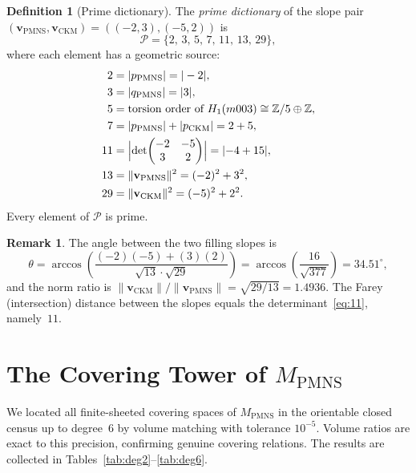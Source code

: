 \documentclass[12pt]{article}
\theoremstyle{definition}
\newtheorem{definition}[theorem]{Definition}
\newtheorem{remark}[theorem]{Remark}
\begin{document}
\begin{definition}[Prime dictionary]
\label{def:dict}
The \emph{prime dictionary} of the slope pair
$(\mathbf{v}_{\mathrm{PMNS}}, \mathbf{v}_{\mathrm{CKM}}) =
((-2,3),(-5,2))$ is
\[
  \mathcal{P} = \{2,\,3,\,5,\,7,\,11,\,13,\,29\},
\]
where each element has a geometric source:
\begin{align}
  2  &= |p_{\mathrm{PMNS}}| = |-2|, \label{eq:2}\\
  3  &= |q_{\mathrm{PMNS}}| = |3|,  \label{eq:3}\\
  5  &= \text{torsion order of }
       H_1(m003) \cong \mathbb{Z}/5 \oplus \mathbb{Z}, \label{eq:5}\\
  7  &= |p_{\mathrm{PMNS}}| + |p_{\mathrm{CKM}}| = 2 + 5, \label{eq:7}\\
  11 &= \Bigl|\det\!\begin{pmatrix}-2&-5\\3&2\end{pmatrix}\Bigr|
       = |{-4+15}|, \label{eq:11}\\
  13 &= \|\mathbf{v}_{\mathrm{PMNS}}\|^2 = (-2)^2+3^2, \label{eq:13}\\
  29 &= \|\mathbf{v}_{\mathrm{CKM}}\|^2  = (-5)^2+2^2. \label{eq:29}
\end{align}
Every element of $\mathcal{P}$ is prime.
\end{definition}

\begin{remark}
The angle between the two filling slopes is
\[
  \theta
  = \arccos\!\left(
      \frac{(-2)(-5)+(3)(2)}{\sqrt{13}\cdot\sqrt{29}}
    \right)
  = \arccos\!\left(\frac{16}{\sqrt{377}}\right)
  = 34.51^\circ,
\]
and the norm ratio is
$\|\mathbf{v}_{\mathrm{CKM}}\|/\|\mathbf{v}_{\mathrm{PMNS}}\|
= \sqrt{29/13} = 1.4936$.
The Farey (intersection) distance between the slopes equals the
determinant~\eqref{eq:11}, namely~$11$.
\end{remark}

\section{The Covering Tower of $M_{\mathrm{PMNS}}$}
\label{sec:tower}

We located all finite-sheeted covering spaces of $M_{\mathrm{PMNS}}$
in the orientable closed census up to degree~6 by volume matching with
tolerance $10^{-5}$. Volume ratios are exact to this precision,
confirming genuine covering relations. The results are collected in
Tables~\ref{tab:deg2}--\ref{tab:deg6}.
\end{document}
